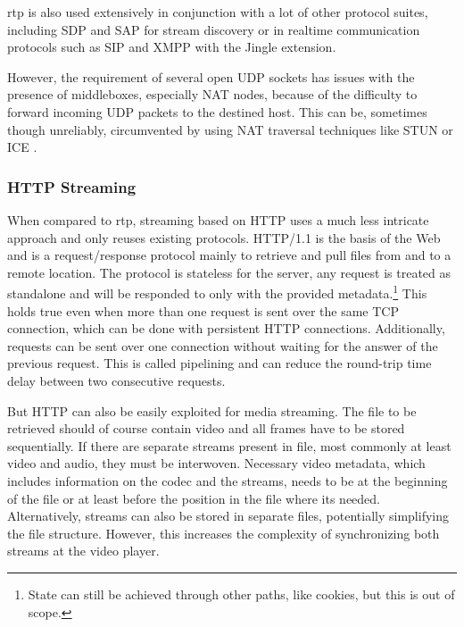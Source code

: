 \gls{rtp} is also used extensively in conjunction with a lot of other protocol suites, including \gls{SDP} \cite{rfc2327} and \gls{SAP} \cite{rfc2974} for stream discovery or in realtime communication protocols such as \gls{SIP} \cite{rfc3261} and \gls{XMPP} \cite{rfc6120,rfc6121} with the Jingle extension.

However, the requirement of several open \gls{UDP} sockets has issues with the presence of middleboxes, especially \gls{NAT} nodes, because of the difficulty to forward incoming \gls{UDP} packets to the destined host. This can be, sometimes though unreliably, circumvented by using \gls{NAT} traversal techniques like \gls{STUN} \cite{rfc5389} or \gls{ICE} \cite{rfc5245}.



\subsubsection{\texorpdfstring{\acrshort{HTTP}}{HTTP} Streaming}

When compared to \gls{rtp}, streaming based on \gls{HTTP} uses a much less intricate approach and only reuses existing protocols. HTTP/1.1 \cite{rfc2616} is the basis of the Web and is a request/response protocol mainly to retrieve and pull files from and to a remote location. The protocol is stateless for the server, any request is treated as standalone and will be responded to only with the provided metadata.\footnote{State can still be achieved through other paths, like cookies, but this is out of scope.} This holds true even when more than one request is sent over the same TCP connection, which can be done with persistent \gls{HTTP} connections. Additionally, requests can be sent over one connection without waiting for the answer of the previous request. This is called pipelining and can reduce the round-trip time delay between two consecutive requests.


But \gls{HTTP} can also be easily exploited for media streaming. The file to be retrieved should of course contain video and all frames have to be stored sequentially. If there are separate streams present in file, most commonly at least video and audio, they must be interwoven.
Necessary video metadata, which includes information on the codec and the streams, needs to be at the beginning of the file or at least before the position in the file where its needed. 
Alternatively, streams can also be stored in separate files, potentially simplifying the file structure. However, this increases the complexity of synchronizing both streams at the video player.


